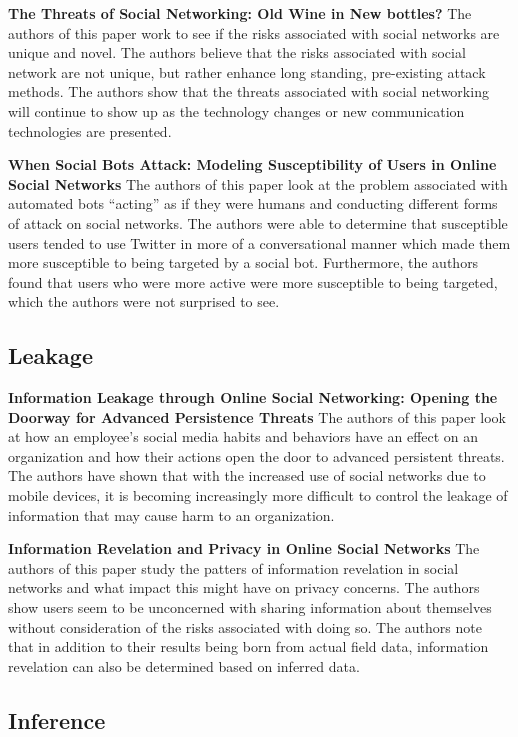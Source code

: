\documentclass[conference]{IEEEtran}
\begin{document}
\textbf {The Threats of Social Networking: Old Wine in New bottles?}
The authors of this paper work to see if the risks associated with social networks are unique and novel.  The authors believe that the risks associated with social network are not unique, but rather enhance long standing, pre-existing attack methods. The authors show that the threats associated with social networking will continue to show up as the technology changes or new communication technologies are presented.  

\textbf {When Social Bots Attack: Modeling Susceptibility of Users in Online Social Networks}
The authors of this paper look at the problem associated with automated bots “acting” as if they were humans and conducting different forms of attack on social networks. The authors were able to determine that susceptible users tended to use Twitter in more of a conversational manner which made them more susceptible to being targeted by a social bot. Furthermore, the authors found that users who were more active were more susceptible to being targeted, which the authors were not surprised to see. 

\subsection{Leakage}

\textbf {Information Leakage through Online Social Networking: Opening the Doorway for Advanced Persistence Threats}
The authors of this paper look at how an employee’s social media habits and behaviors have an effect on an organization and how their actions open the door to advanced persistent threats. The authors have shown that with the increased use of social networks due to mobile devices, it is becoming increasingly more difficult to control the leakage of information that may cause harm to an organization. 

\textbf {Information Revelation and Privacy in Online Social Networks}
The authors of this paper study the patters of information revelation in social networks and what impact this might have on privacy concerns. The authors show users seem to be unconcerned with sharing information about themselves without consideration of the risks associated with doing so. The authors note that in addition to their results being born from actual field data, information revelation can also be determined based on inferred data.  

\subsection{Inference}
\end{document}
